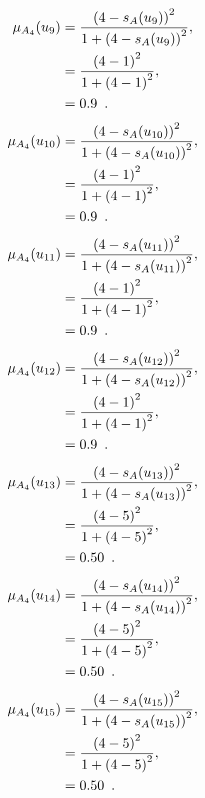 \documentclass[a4paper,openany]{book}
\begin{document}
				\begin{align}
					\mu_{A_4}(u_9) &= \frac{\left(4-s_A(u_9)\right)^2}{1 + \left(4-s_A(u_9)\right)^2} ,\\
					&= \frac{\left(4-1\right)^2}{1 + \left(4-1\right)^2} \notag ,\\
					&= 0.9 \enspace. \notag
				\end{align}
				\begin{align}
					\mu_{A_4}(u_{10}) &= \frac{\left(4-s_A(u_{10})\right)^2}{1 + \left(4-s_A(u_{10})\right)^2} ,\\
					&= \frac{\left(4-1\right)^2}{1 + \left(4-1\right)^2} \notag ,\\
					&= 0.9 \enspace. \notag
				\end{align}
				\begin{align}
					\mu_{A_4}(u_{11}) &= \frac{\left(4-s_A(u_{11})\right)^2}{1 + \left(4-s_A(u_{11})\right)^2} ,\\
					&= \frac{\left(4-1\right)^2}{1 + \left(4-1\right)^2} \notag ,\\
					&= 0.9 \enspace. \notag
				\end{align}
				\begin{align}
					\mu_{A_4}(u_{12}) &= \frac{\left(4-s_A(u_{12})\right)^2}{1 + \left(4-s_A(u_{12})\right)^2} ,\\
					&= \frac{\left(4-1\right)^2}{1 + \left(4-1\right)^2} \notag ,\\
					&= 0.9 \enspace. \notag
				\end{align}
				\begin{align}
					\mu_{A_4}(u_{13}) &= \frac{\left(4-s_A(u_{13})\right)^2}{1 + \left(4-s_A(u_{13})\right)^2} ,\\
					&= \frac{\left(4-5\right)^2}{1 + \left(4-5\right)^2} \notag ,\\
					&= 0.50 \enspace. \notag
				\end{align}
				\begin{align}
					\mu_{A_4}(u_{14}) &= \frac{\left(4-s_A(u_{14})\right)^2}{1 + \left(4-s_A(u_{14})\right)^2} ,\\
					&= \frac{\left(4-5\right)^2}{1 + \left(4-5\right)^2} \notag ,\\
					&= 0.50 \enspace. \notag
				\end{align}
				\begin{align}
					\mu_{A_4}(u_{15}) &= \frac{\left(4-s_A(u_{15})\right)^2}{1 + \left(4-s_A(u_{15})\right)^2} ,\\
					&= \frac{\left(4-5\right)^2}{1 + \left(4-5\right)^2} \notag ,\\
					&= 0.50 \enspace. \notag
				\end{align}
\end{document}

